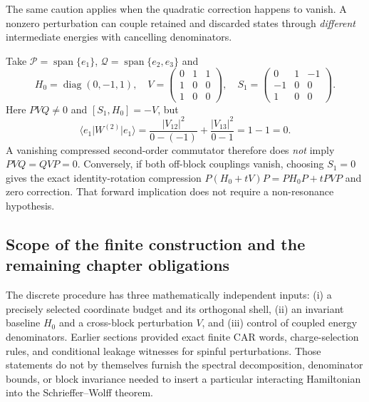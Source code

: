 The same caution applies when the quadratic correction happens to
vanish.  A nonzero perturbation can couple retained and discarded
states through \emph{different} intermediate energies with cancelling
denominators.

\begin{example}
\label{ex:ch21-sw-three-level}
Take $\mathcal P=\operatorname{span}\{e_1\}$,
$\mathcal Q=\operatorname{span}\{e_2,e_3\}$ and
\begin{equation}
 H_0=\operatorname{diag}(0,-1,1),\quad
 V=\begin{pmatrix}0&1&1\\1&0&0\\1&0&0\end{pmatrix},\quad
 S_1=\begin{pmatrix}0&1&-1\\-1&0&0\\1&0&0\end{pmatrix}.
\label{eq:ch21-sw-three-input}
\end{equation}
Here $PVQ\ne0$ and $[S_1,H_0]=-V$, but
\begin{equation}
\langle e_1\lvert W^{(2)}\rvert e_1\rangle
 =\frac{|V_{12}|^2}{0-(-1)}
  +\frac{|V_{13}|^2}{0-1}=1-1=0.
\label{eq:ch21-sw-three-cancel}
\end{equation}
A vanishing compressed second-order commutator therefore does
\emph{not} imply $PVQ=QVP=0$.  Conversely, if both off-block
couplings vanish, choosing $S_1=0$ gives the exact identity-rotation
compression $P(H_0+tV)P=PH_0P+tPVP$ and zero correction.  That
forward implication does not require a non-resonance hypothesis.
\end{example}

\subsection{Scope of the finite construction and the remaining chapter obligations}
\label{subsec:ch21-effective-scope}

The discrete procedure has three mathematically independent inputs:
(i) a precisely selected coordinate budget and its orthogonal shell,
(ii) an invariant baseline $H_0$ and a cross-block perturbation $V$,
and (iii) control of coupled energy denominators.  Earlier sections
provided exact finite CAR words, charge-selection rules, and conditional
leakage witnesses for spinful perturbations.  Those statements do not
by themselves furnish the spectral decomposition, denominator bounds,
or block invariance needed to insert a particular interacting
Hamiltonian into the Schrieffer--Wolff theorem.

